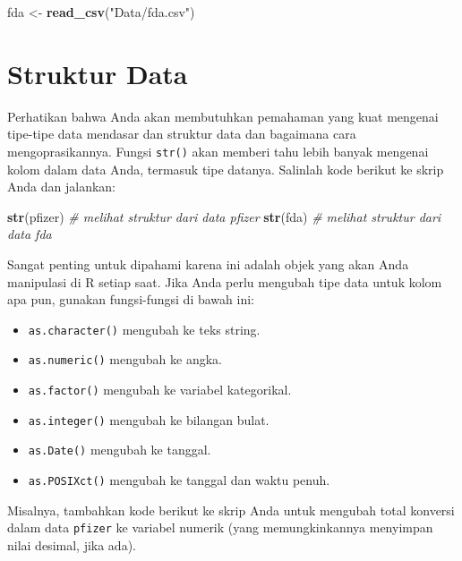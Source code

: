 \documentclass[
]{book}
\newenvironment{Shaded}{\begin{snugshade}}{\end{snugshade}}
\newcommand{\CommentTok}[1]{\textcolor[rgb]{0.56,0.35,0.01}{\textit{#1}}}
\newcommand{\FunctionTok}[1]{\textcolor[rgb]{0.13,0.29,0.53}{\textbf{#1}}}
\newcommand{\NormalTok}[1]{#1}
\newcommand{\OtherTok}[1]{\textcolor[rgb]{0.56,0.35,0.01}{#1}}
\newcommand{\StringTok}[1]{\textcolor[rgb]{0.31,0.60,0.02}{#1}}
\providecommand{\tightlist}{%
  \setlength{\itemsep}{0pt}\setlength{\parskip}{0pt}}
\begin{document}
\begin{Shaded}
\begin{Highlighting}[]
\NormalTok{fda }\OtherTok{\textless{}{-}} \FunctionTok{read\_csv}\NormalTok{(}\StringTok{"Data/fda.csv"}\NormalTok{)}
\end{Highlighting}
\end{Shaded}

\hypertarget{struktur-data-1}{%
\section{Struktur Data}\label{struktur-data-1}}

Perhatikan bahwa Anda akan membutuhkan pemahaman yang kuat mengenai tipe-tipe data mendasar dan struktur data dan bagaimana cara mengoprasikannya. Fungsi \texttt{str()} akan memberi tahu lebih banyak mengenai kolom dalam data Anda, termasuk tipe datanya. Salinlah kode berikut ke skrip Anda dan jalankan:

\begin{Shaded}
\begin{Highlighting}[]
\FunctionTok{str}\NormalTok{(pfizer)                                       }\CommentTok{\# melihat struktur dari data \textasciigrave{}pfizer\textasciigrave{}}
\FunctionTok{str}\NormalTok{(fda)                                          }\CommentTok{\# melihat struktur dari data \textasciigrave{}fda\textasciigrave{}}
\end{Highlighting}
\end{Shaded}

Sangat penting untuk dipahami karena ini adalah objek yang akan Anda manipulasi di R setiap saat. Jika Anda perlu mengubah tipe data untuk kolom apa pun, gunakan fungsi-fungsi di bawah ini:

\begin{itemize}
\tightlist
\item
  \texttt{as.character()} mengubah ke teks string.
\item
  \texttt{as.numeric()} mengubah ke angka.
\item
  \texttt{as.factor()} mengubah ke variabel kategorikal.
\item
  \texttt{as.integer()} mengubah ke bilangan bulat.
\item
  \texttt{as.Date()} mengubah ke tanggal.
\item
  \texttt{as.POSIXct()} mengubah ke tanggal dan waktu penuh.
\end{itemize}

Misalnya, tambahkan kode berikut ke skrip Anda untuk mengubah total konversi dalam data \texttt{pfizer} ke variabel numerik (yang memungkinkannya menyimpan nilai desimal, jika ada).
\end{document}
